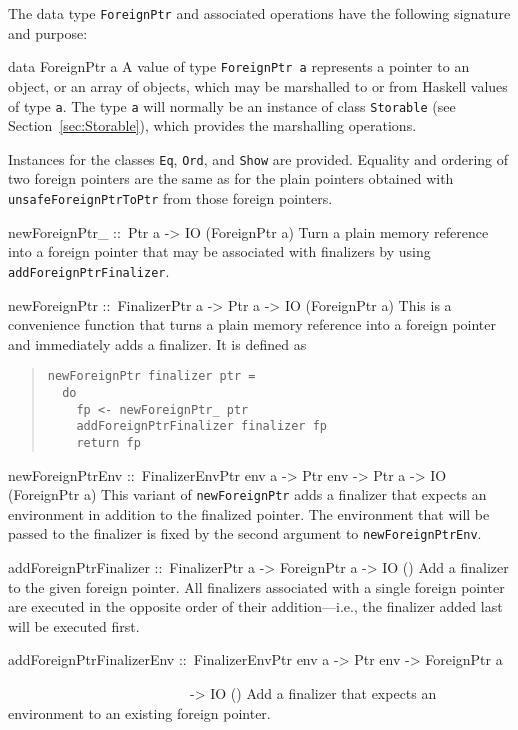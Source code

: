 \documentclass[a4paper,twoside]{article}
\makeatletter
\newcommand{\code}[1]{\texttt{#1}}      %
\newenvironment{codedesc}{%
  \list{}{\labelwidth\z@
    \let\makelabel\codedesclabel}
  }{%
  \endlist
  }
\newcommand*{\codedesclabel}[1]{%
  \hspace{-\leftmargin}
  \parbox[b]{\labelwidth}{\makebox[0pt][l]{\code{#1}}\\}\hfil\relax
  }
\newcommand{\combineitems}{\vspace*{-\itemsep}\vspace*{-\parsep}\vspace*{-1em}}
\makeatother
\begin{document}
The data type \code{ForeignPtr} and associated operations have the following
signature and purpose:
%
\begin{codedesc}
\item[data ForeignPtr a] A value of type \code{ForeignPtr a} represents a
  pointer to an object, or an array of objects, which may be marshalled to or
  from Haskell values of type \code{a}.  The type \code{a} will normally be an
  instance of class \code{Storable} (see Section~\ref{sec:Storable}), which
  provides the marshalling operations.
  
  Instances for the classes \code{Eq}, \code{Ord}, and \code{Show} are
  provided.  Equality and ordering of two foreign pointers are the same as for
  the plain pointers obtained with \code{unsafeForeignPtrToPtr} from those
  foreign pointers.
  
\item[newForeignPtr\_ ::\ Ptr a -> IO (ForeignPtr a)]
  Turn a plain memory reference into a foreign pointer that may be associated
  with finalizers by using \code{addForeignPtrFinalizer}.
  
\item[newForeignPtr ::\ FinalizerPtr a -> Ptr a -> IO (ForeignPtr a)] This is
  a convenience function that turns a plain memory reference into a foreign
  pointer and immediately adds a finalizer.  It is defined as
  \begin{quote}
\begin{verbatim}
newForeignPtr finalizer ptr = 
  do
    fp <- newForeignPtr_ ptr
    addForeignPtrFinalizer finalizer fp
    return fp
\end{verbatim}
  \end{quote}
   
\item[newForeignPtrEnv ::\ FinalizerEnvPtr env a -> Ptr env -> Ptr a -> IO
  (ForeignPtr a)] This variant of \code{newForeignPtr} adds a finalizer that
  expects an environment in addition to the finalized pointer.  The
  environment that will be passed to the finalizer is fixed by the second
  argument to \code{newForeignPtrEnv}.

\item[addForeignPtrFinalizer ::\ FinalizerPtr a -> ForeignPtr a -> IO
  ()] Add a finalizer to the given foreign pointer.  All finalizers
  associated with a single foreign pointer are executed in the opposite order
  of their addition---i.e., the finalizer added last will be executed first.
  
\item[addForeignPtrFinalizerEnv ::\ FinalizerEnvPtr env a -> Ptr env ->
  ForeignPtr a]
\item[~~~~~~~~~~~~~~~~~~~~~~~~~~-> IO ()]\combineitems Add a finalizer that
  expects an environment to an existing foreign pointer.


\end{codedesc}
\end{document}
